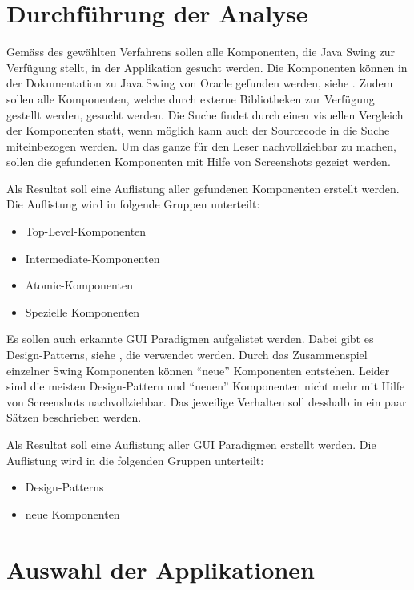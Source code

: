   \section{Durchführung der Analyse}
  
  Gemäss des gewählten Verfahrens sollen alle Komponenten, die Java Swing zur
  Verfügung stellt, in der Applikation gesucht werden. Die Komponenten können in
  der Dokumentation zu Java Swing von Oracle gefunden werden, siehe
  \cite{SwingComponentsByOracle}. Zudem sollen alle Komponenten, welche durch
  externe Bibliotheken zur Verfügung gestellt werden, gesucht werden. Die Suche
  findet durch einen visuellen Vergleich der Komponenten statt, wenn möglich
  kann auch der Sourcecode in die Suche miteinbezogen werden. Um das ganze für
  den Leser nachvollziehbar zu machen, sollen die gefundenen Komponenten mit
  Hilfe von Screenshots gezeigt werden.
  
  Als Resultat soll eine Auflistung aller gefundenen Komponenten erstellt
  werden. Die Auflistung wird in folgende Gruppen unterteilt:
  
  \begin{itemize}
    \item Top-Level-Komponenten
    \item Intermediate-Komponenten
    \item Atomic-Komponenten
    \item Spezielle Komponenten
  \end{itemize}
  
  \noindent
  Es sollen auch erkannte GUI Paradigmen aufgelistet werden. Dabei gibt es 
  Design-Patterns, siehe \cite{DesignPattern}, die verwendet werden. Durch das
  Zusammenspiel einzelner Swing Komponenten können ``neue'' Komponenten
  entstehen. Leider sind die meisten Design-Pattern und ``neuen'' Komponenten
  nicht mehr mit Hilfe von Screenshots nachvollziehbar. Das jeweilige Verhalten
  soll desshalb in ein paar Sätzen beschrieben werden.
  
  Als Resultat soll eine Auflistung aller GUI Paradigmen erstellt werden. Die
  Auflistung wird in die folgenden Gruppen unterteilt:
  
   \begin{itemize}
    \item Design-Patterns
    \item neue Komponenten
  \end{itemize}
  
  \section{Auswahl der Applikationen}
  

